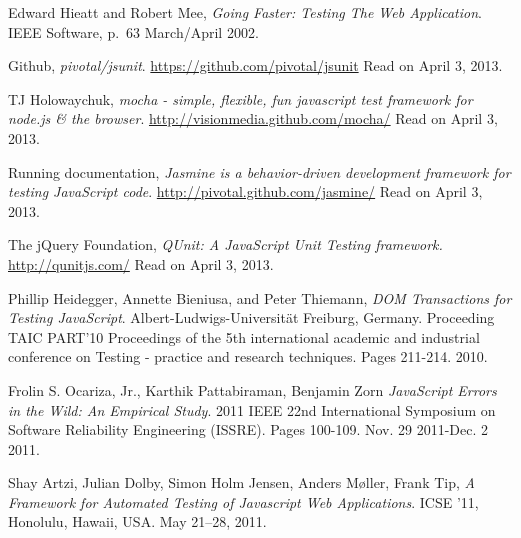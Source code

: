 \documentclass[11pt]{article}
\begin{document}
\begin{thebibliography}{9}

  Edward Hieatt and Robert Mee,
  \emph{Going Faster: Testing The Web Application}.
  IEEE Software, p.~63
  March/April 2002.

  Github,
  \emph{pivotal/jsunit}.
  \url{https://github.com/pivotal/jsunit}
  Read on April 3, 2013.

  TJ Holowaychuk,
  \emph{mocha - simple, flexible, fun javascript test framework for node.js \& the browser}.
  \url{http://visionmedia.github.com/mocha/}
  Read on April 3, 2013.

  Running documentation,
  \emph{Jasmine is a behavior-driven development framework for testing JavaScript code}.
  \url{http://pivotal.github.com/jasmine/}
  Read on April 3, 2013.

  The jQuery Foundation,
  \emph{QUnit: A JavaScript Unit Testing framework.}
  \url{http://qunitjs.com/}
  Read on April 3, 2013.

  Phillip Heidegger, Annette Bieniusa, and Peter Thiemann,
  \emph{DOM Transactions for Testing JavaScript}.
  Albert-Ludwigs-Universität Freiburg, Germany.
  Proceeding TAIC PART'10 Proceedings of the 5th international academic and industrial conference on Testing - practice and research techniques.
  Pages 211-214.
  2010.

  Frolin S. Ocariza, Jr., Karthik Pattabiraman, Benjamin Zorn
  \emph{JavaScript Errors in the Wild: An Empirical Study}.
  2011 IEEE 22nd International Symposium on Software Reliability Engineering (ISSRE).
  Pages 100-109.
  Nov. 29 2011-Dec. 2 2011.

  Shay Artzi, Julian Dolby, Simon Holm Jensen, Anders Møller, Frank Tip,
  \emph{A Framework for Automated Testing of Javascript Web Applications}.
  ICSE ’11, Honolulu, Hawaii, USA.
  May 21–28, 2011.

\end{thebibliography}
\end{document}
